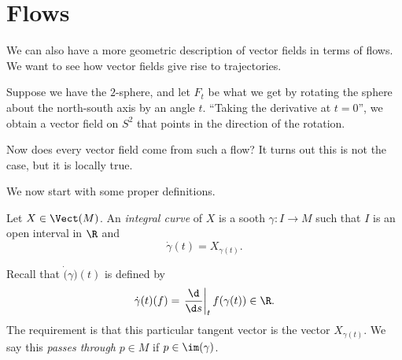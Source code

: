 \documentclass[a4paper]{article}
\begin{document}
\section{Flows}
We can also have a more geometric description of vector fields in terms of flows. We want to see how vector fields give rise to trajectories.

Suppose we have the $2$-sphere, and let $F_t$ be what we get by rotating the sphere about the north-south axis by an angle $t$. ``Taking the derivative at $t = 0$'', we obtain a vector field on $S^2$ that points in the direction of the rotation.


Now does every vector field come from such a flow? It turns out this is not the case, but it is locally true.

We now start with some proper definitions.

\begin{defi}
  Let $X \in \Vect(M)$. An \emph{integral curve} of $X$ is a sooth $\gamma: I \to M$ such that $I$ is an open interval in $\R$ and
  \[
    \dot{\gamma}(t) = X_{\gamma(t)}.
  \]
\end{defi}
Recall that $\dot(\gamma)(t)$ is defined by
\[
  \dot{\gamma}(t)(f) = \left.\frac{\d}{\d s}\right|_t f(\gamma(t)) \in \R.
\]
The requirement is that this particular tangent vector is the vector $X_{\gamma(t)}$. We say this \emph{passes through} $p \in M$ if $p \in\im(\gamma)$.
\end{document}
